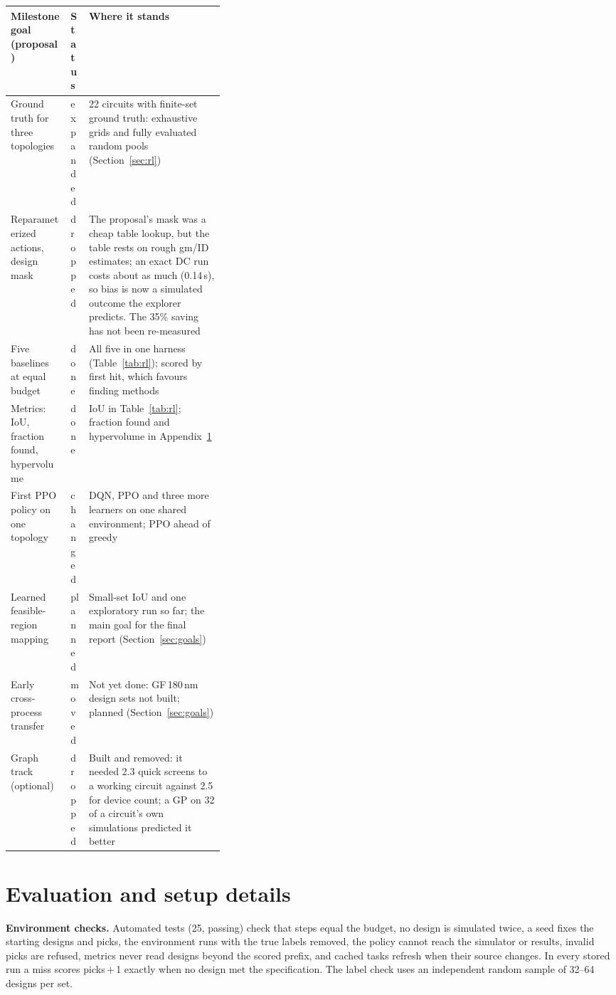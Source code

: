 \documentclass[10pt]{article}
\newcommand{\rowrule}{\specialrule{0.3pt}{1.5pt}{1.5pt}}
\begin{document}
{\small\noindent
\begin{tabularx}{\linewidth}{@{}L{0.28\linewidth}L{0.07\linewidth}Y@{}}
\toprule
Milestone goal (proposal) & Status & Where it stands \\
\midrule
Ground truth for three topologies & expanded & 22 circuits with finite-set ground truth: exhaustive grids and fully evaluated random pools (Section~\ref{sec:rl}) \\ \rowrule
Reparameterized actions, design mask & dropped & The proposal's mask was a cheap table lookup, but the table rests on rough gm/ID estimates; an exact DC run costs about as much (0.14\,s), so bias is now a simulated outcome the explorer predicts. The 35\% saving has not been re-measured \\ \rowrule
Five baselines at equal budget & done & All five in one harness (Table~\ref{tab:rl}); scored by first hit, which favours finding methods \\ \rowrule
Metrics: IoU, fraction found, hypervolume & done & IoU in Table~\ref{tab:rl}; fraction found and hypervolume in Appendix~\ref{app:setup} \\ \rowrule
First PPO policy on one topology & changed & DQN, PPO and three more learners on one shared environment; PPO ahead of greedy \\ \rowrule
Learned feasible-region mapping & planned & Small-set IoU and one exploratory run so far; the main goal for the final report (Section~\ref{sec:goals}) \\ \rowrule
Early cross-process transfer & moved & Not yet done: GF\,180\,nm design sets not built; planned (Section~\ref{sec:goals}) \\ \rowrule
Graph track (optional) & dropped & Built and removed: it needed 2.3 quick screens to a working circuit against 2.5 for device count; a GP on 32 of a circuit's own simulations predicted it better\label{sec:gnn} \\
\bottomrule
\end{tabularx}

\par}


\section{Evaluation and setup details}\label{app:setup}
\textbf{Environment checks.} Automated tests (25, passing) check that steps equal the budget, no design is simulated
twice, a seed fixes the starting designs and picks, the environment runs with the true labels removed, the policy
cannot reach the simulator or results, invalid picks are refused, metrics never read designs beyond the scored prefix,
and cached tasks refresh when their source changes. In every stored run a miss scores picks\,+\,1 exactly when no
design met the specification. The label check uses an independent random sample of 32--64 designs per set.
\end{document}
